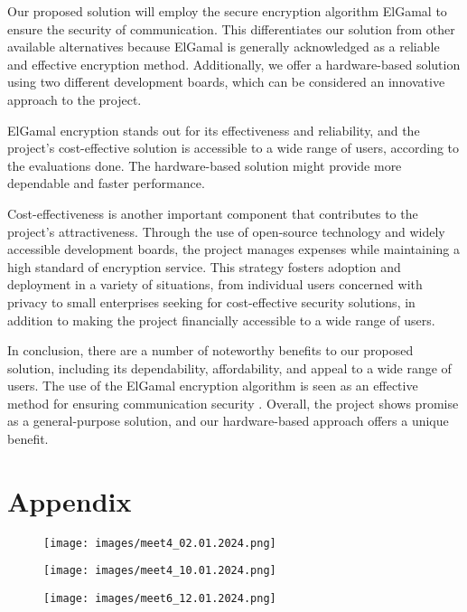 \documentclass[12pt]{article}
\begin{document}
	
	Our proposed solution will employ the secure encryption algorithm ElGamal to ensure the security of communication. This differentiates our solution from other available alternatives because ElGamal is generally acknowledged as a reliable and effective encryption method\cite{mollin2001introduction}. Additionally, we offer a hardware-based solution using two different development boards, which can be considered an innovative approach to the project.
	
	ElGamal encryption stands out for its effectiveness and reliability, and the project's cost-effective solution is accessible to a wide range of users, according to the evaluations done. The hardware-based solution might provide more dependable and faster performance.
	
	Cost-effectiveness is another important component that contributes to the project's attractiveness. Through the use of open-source technology and widely accessible development boards, the project manages expenses while maintaining a high standard of encryption service. This strategy fosters adoption and deployment in a variety of situations, from individual users concerned with privacy to small enterprises seeking for cost-effective security solutions, in addition to making the project financially accessible to a wide range of users.
	
	In conclusion, there are a number of noteworthy benefits to our proposed solution, including its dependability, affordability, and appeal to a wide range of users. The use of the ElGamal encryption algorithm is seen as an effective method for ensuring communication security	\cite{van1999fundamentals}. Overall, the project shows promise as a general-purpose solution, and our hardware-based approach offers a unique benefit.
	\newpage
	
	
	
	\newpage
	\section{Appendix}
	\begin{figure}[H]
		\centering
		\label{Meeting4}
		\texttt{[image: images/meet4\_02.01.2024.png]}\\[0.5 cm]
		
	\end{figure}
	\begin{figure}[H]
		\centering
		\label{Meeting5}
		\texttt{[image: images/meet4\_10.01.2024.png]}\\[0.5 cm]			
	\end{figure}
	\begin{figure}[H]
		\centering
		\label{Meeting3}
		\texttt{[image: images/meet6\_12.01.2024.png]}\\[0.5 cm]			
	\end{figure}
	
\end{document}
